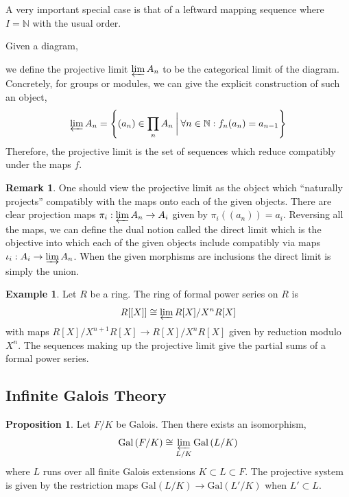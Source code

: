 \documentclass{article}
\newcommand{\Gal}[1]{\mathrm{Gal}\left( #1 \right)}
\newcommand{\N}{\mathbb{N}}
\theoremstyle{definition}
\newtheorem{proposition}[theorem]{Proposition}
\newtheorem{example}[theorem]{Example}
\newtheorem{remark}{Remark}[section]
\newenvironment{definition}[1][Definition:]{\begin{trivlist}
\item[\hskip \labelsep {\bfseries #1}]}{\end{trivlist}}
\begin{document}
\noindent
A very important special case is that of a leftward mapping sequence where $I = \N$ with the usual order. 

\begin{definition}
Given a diagram,
\begin{center}
\end{center}
we define the projective limit $\varprojlim A_n$ to be the categorical limit of the diagram. Concretely, for groups or modules, we can give the explicit construction of such an object,
\[ \varprojlim A_n = \left\{ (a_n) \in \prod_n A_n \: \bigg| \: \forall n \in \N : f_n(a_n) = a_{n-1}  \right\} \]
Therefore, the projective limit is the set of sequences which reduce compatibly under the maps $f$.  
\end{definition}

\begin{remark}
One should view the projective limit as the object which ``naturally projects'' compatibly with the maps onto each of the given objects. There are clear projection maps $\pi_i : \varprojlim A_n \to A_i$ given by $\pi_i((a_n)) = a_i$. Reversing all the maps, we can define the dual notion called the direct limit which is the objective into which each of the given objects include compatibly via maps $\iota_i : A_i \to \varinjlim A_n$. When the given morphisms are inclusions the direct limit is simply the union. 
\end{remark}

\begin{example}
Let $R$ be a ring. The ring of formal power series on $R$ is
\[ R[[X]] \cong \varprojlim R[X] / X^n R[X] \]
with maps $R[X] / X^{n+1} R[X] \to R[X] / X^n R[X]$ given by reduction modulo $X^n$. The sequences making up the projective limit give the partial sums of a formal power series.
\end{example}

\subsection{Infinite Galois Theory}

\begin{proposition}
Let $F / K$ be Galois. Then there exists an isomorphism,
\[ \Gal{F / K} \cong \varprojlim_{L/K} \Gal{L / K} \] 
where $L$ runs over all finite Galois extensions $K \subset L \subset F$. The projective system is given by the restriction maps $\Gal{L / K} \to \Gal{L' / K}$ when $L' \subset L$. 
\end{proposition}
\end{document}
